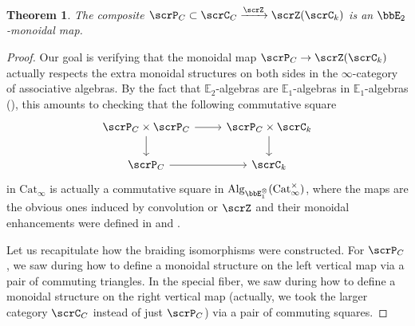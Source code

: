 \documentclass[10pt, reqno]{amsart}
\theoremstyle{plain}
\newtheorem{theorem}{Theorem}[section]
\theoremstyle{definition}
\numberwithin{equation}{section}
\begin{document}
	\begin{theorem}\label{thm_E2_mor}
		The composite $\scrP_C \subset \scrC_C\xrightarrow{\scrZ} \scrZ(\scrC_k)$ is an $\bbE_2$-monoidal map.
	\end{theorem} 
	
	\begin{proof}
		Our goal is verifying that the monoidal map $\scrP_C \to \scrZ(\scrC_k)$ actually respects the extra monoidal structures on both sides in the $\infty$-category of associative algebras. By the fact that $\mathbb{E}_2$-algebras are $\mathbb{E}_1$-algebras in $\mathbb{E}_1$-algebras (\cite[5.1.2.2]{Lur17}), this amounts to checking%
		that the following commutative square 
		\begin{equation}\begin{tikzcd}
				\scrP_C\times \scrP_C& \scrP_C \times \scrC_{k}\\
				\scrP_C & \scrC_k
				\arrow[from=1-2, to=2-2]
				\arrow[from=1-1, to=2-1]
				\arrow[from=1-1, to=1-2]
				\arrow[from=2-1, to=2-2]
			\end{tikzcd}
		\end{equation}
		in $\mathrm{Cat}_\infty$ is actually a commutative square in $\mathrm{Alg}_{\bbE_1^\otimes}(\mathrm{Cat}^\times_\infty)$, where the maps are the obvious ones induced by convolution or $\scrZ$ and their monoidal enhancements were defined in  and .
		
		
		Let us recapitulate how the braiding isomorphisms were constructed. For $\scrP_C$, we saw during  how to define a monoidal structure on the left vertical map via a pair of commuting triangles.
		In the special fiber, we saw during  how to define a monoidal structure on the right vertical map (actually, we took the larger category $\scrC_C$ instead of just $\scrP_C$) via a pair of commuting squares.
		

\end{proof}
\end{document}
